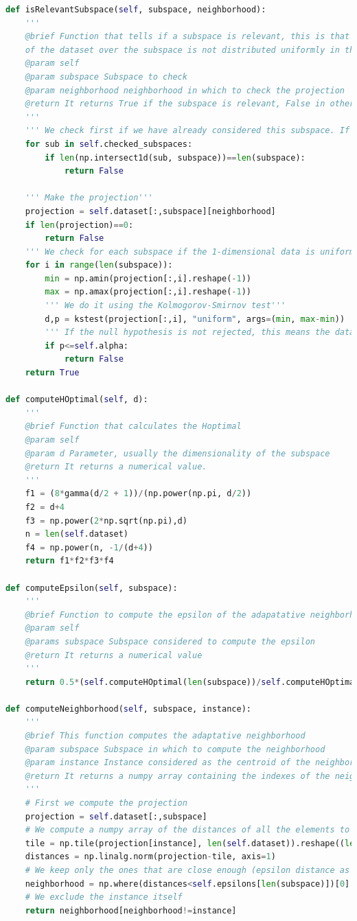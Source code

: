 \begin{lstlisting}[language=Python]
def isRelevantSubspace(self, subspace, neighborhood):
	'''
	@brief Function that tells if a subspace is relevant, this is that the projection
	of the dataset over the subspace is not distributed uniformly in the neighborhood
	@param self
	@param subspace Subspace to check
	@param neighborhood neighborhood in which to check the projection
	@return It returns True if the subspace is relevant, False in other case.
	'''
	''' We check first if we have already considered this subspace. If so, it is not relevant anymore.'''
	for sub in self.checked_subspaces:
		if len(np.intersect1d(sub, subspace))==len(subspace):
			return False

	''' Make the projection'''
	projection = self.dataset[:,subspace][neighborhood]
	if len(projection)==0:
		return False
	''' We check for each subspace if the 1-dimensional data is uniformly distributed'''
	for i in range(len(subspace)):
		min = np.amin(projection[:,i].reshape(-1))
		max = np.amax(projection[:,i].reshape(-1))
		''' We do it using the Kolmogorov-Smirnov test'''
		d,p = kstest(projection[:,i], "uniform", args=(min, max-min))
		''' If the null hypothesis is not rejected, this means the data follow a uniform distribution'''
		if p<=self.alpha:
			return False
	return True

def computeHOptimal(self, d):
	'''
	@brief Function that calculates the Hoptimal
	@param self
	@param d Parameter, usually the dimensionality of the subspace
	@return It returns a numerical value.
	'''
	f1 = (8*gamma(d/2 + 1))/(np.power(np.pi, d/2))
	f2 = d+4
	f3 = np.power(2*np.sqrt(np.pi),d)
	n = len(self.dataset)
	f4 = np.power(n, -1/(d+4))
	return f1*f2*f3*f4

def computeEpsilon(self, subspace):
	'''
	@brief Function to compute the epsilon of the adapatative neighborhood
	@param self
	@params subspace Subspace considered to compute the epsilon
	@return It returns a numerical value
	'''
	return 0.5*(self.computeHOptimal(len(subspace))/self.computeHOptimal(2))

def computeNeighborhood(self, subspace, instance):
	'''
	@brief This function computes the adaptative neighborhood
	@param subspace Subspace in which to compute the neighborhood
	@param instance Instance considered as the centroid of the neighborhood (index of the element)
	@return It returns a numpy array containing the indexes of the neighborhood
	'''
	# First we compute the projection
	projection = self.dataset[:,subspace]
	# We compute a numpy array of the distances of all the elements to the instance
	tile = np.tile(projection[instance], len(self.dataset)).reshape((len(self.dataset),len(projection[instance])))
	distances = np.linalg.norm(projection-tile, axis=1)
	# We keep only the ones that are close enough (epsilon distance as max)
	neighborhood = np.where(distances<self.epsilons[len(subspace)])[0]
	# We exclude the instance itself
	return neighborhood[neighborhood!=instance]


\end{lstlisting}
